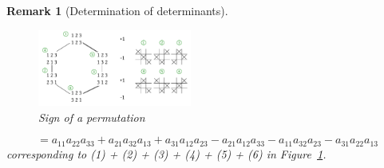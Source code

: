 \documentclass[a4paper,landscape,twocolumn]{article}
\newtheorem{rem}{Remark}
\begin{document}
\begin{rem}[Determination of determinants]
  \begin{figure}[!h]
    \begin{center}
      \includegraphics[width=0.45\textwidth]{img/sign-of-permutation.pdf}
      \caption{Sign of a permutation}
      \label{img:perm-sign}
    \end{center}
  \end{figure}

  \[ = a_{11} a_{22} a_{33} + a_{21} a_{32} a_{13} + a_{31} a_{12} a_{23} - a_{21} a_{12} a_{33} - a_{11} a_{32} a_{23} - a_{31} a_{22} a_{13} \]
  corresponding to (1) + (2) + (3) + (4) + (5) + (6) in Figure~\ref{img:perm-sign}.
\end{rem}
\end{document}
